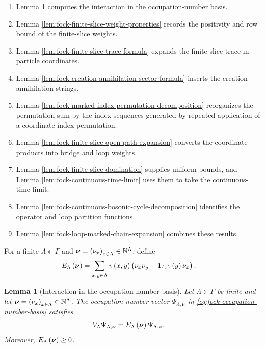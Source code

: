 \documentclass[11pt,a4paper]{article}
\theoremstyle{plain}
\newtheorem{lem}[thm]{Lemma}
\theoremstyle{definition}
\theoremstyle{remark}
\begin{document}
\begin{enumerate}
\def\labelenumi{\arabic{enumi}.}

\item
  Lemma \ref{lem:fock-interaction-occupation-eigenvalue} computes the interaction in the occupation-number basis.
\item
  Lemma \ref{lem:fock-finite-slice-weight-properties} records the positivity and row bound of the finite-slice weights.
\item
  Lemma \ref{lem:fock-finite-slice-trace-formula} expands the finite-slice trace in particle coordinates.
\item
  Lemma \ref{lem:fock-creation-annihilation-sector-formula} inserts the creation--annihilation strings.
\item
  Lemma \ref{lem:fock-marked-index-permutation-decomposition} reorganizes the permutation sum by the index sequences generated by repeated application of a coordinate-index permutation.
\item
  Lemma \ref{lem:fock-finite-slice-open-path-expansion} converts the coordinate products into bridge and loop weights.
\item
  Lemma \ref{lem:fock-finite-slice-domination} supplies uniform bounds, and Lemma \ref{lem:fock-continuous-time-limit} uses them to take the continuous-time limit.
\item
  Lemma \ref{lem:fock-continuous-bosonic-cycle-decomposition} identifies the operator and loop partition functions.
\item
  Lemma \ref{lem:fock-loop-marked-chain-expansion} combines these results.
\end{enumerate}

For a finite \(\Lambda\Subset\Gamma\) and \(\boldsymbol{\nu}=\seq{\nu_x}{x\in\Lambda}\in\monnat^{\Lambda}\), define \begin{equation}
\begin{aligned}
E_{\Lambda} \left( \boldsymbol{\nu} \right)
& =
\sum_{x,y\in\Lambda}
v \left( x,y \right)
\left( \nu_x\nu_y-\boldsymbol{1}_{\left\{ x \right\}} \left( y \right)\nu_x \right).
\end{aligned}
\label{eq:fock-finite-slice-occupation-energy}
\end{equation}

\begin{lem}[Interaction in the occupation-number basis]\label{lem:fock-interaction-occupation-eigenvalue}
Let $\Lambda\Subset\Gamma$ be finite and let
$\boldsymbol{\nu}=\seq{\nu_x}{x\in\Lambda}\in\monnat^{\Lambda}$.
The occupation-number vector $\Psi_{\Lambda,\boldsymbol{\nu}}$ in
\eqref{eq:fock-occupation-number-basis} satisfies
$$\begin{aligned}
V_{\Lambda}\Psi_{\Lambda,\boldsymbol{\nu}}
& =
E_{\Lambda} \left( \boldsymbol{\nu} \right)\Psi_{\Lambda,\boldsymbol{\nu}}.
\end{aligned}$$
Moreover, $E_{\Lambda} \left( \boldsymbol{\nu} \right)\geq0$.
\end{lem}
\end{document}
